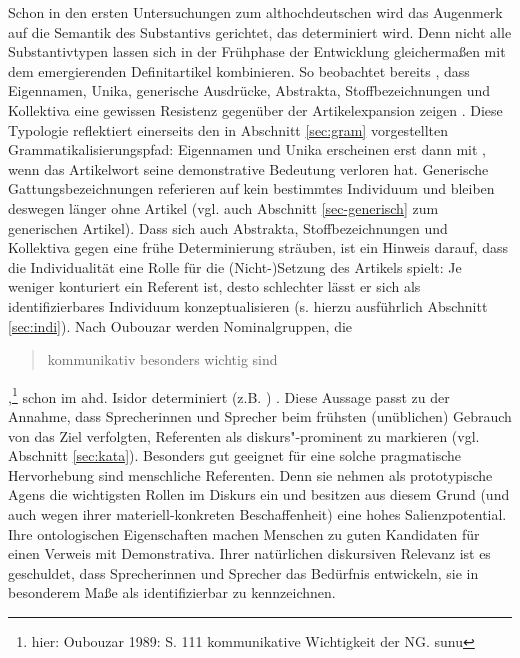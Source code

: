 Schon in den ersten Untersuchungen zum althochdeutschen  wird das Augenmerk auf die Semantik des Substantivs gerichtet, das determiniert wird. Denn nicht alle Substantivtypen lassen sich in der Frühphase der Entwicklung gleichermaßen mit dem emergierenden Definitartikel kombinieren. So beobachtet bereits \textcite{Graf1905}, dass Eigennamen, Unika, generische Ausdrücke, Abstrakta, Stoffbezeichnungen und Kollektiva eine gewissen Resistenz gegenüber der Artikelexpansion zeigen \parencite[ähnlich][]{Bell1907, Hodler1954}. Diese Typologie reflektiert einerseits den in Abschnitt \ref{sec:gram} vorgestellten Grammatikalisierungspfad: Eigennamen und Unika erscheinen erst dann mit , wenn das Artikelwort seine demonstrative Bedeutung verloren hat. Generische Gattungsbezeichnungen referieren auf kein bestimmtes Individuum und bleiben deswegen länger ohne Artikel (vgl. auch Abschnitt \ref{sec-generisch} zum generischen Artikel). Dass sich auch Abstrakta, Stoffbezeichnungen und Kollektiva  gegen eine frühe Determinierung sträuben, ist ein Hinweis darauf, dass die Individualität eine Rolle für die (Nicht-)Setzung des Artikels spielt: Je weniger konturiert ein Referent ist, desto schlechter lässt er sich als identifizierbares Individuum konzeptualisieren (s. hierzu ausführlich Abschnitt \ref{sec:indi}). 
Nach Oubouzar werden Nominalgruppen, die \blockcquote[75]{Oubouzar1992}{kommunikativ besonders wichtig sind},\footnote{hier: Oubouzar 1989: S. 111 kommunikative Wichtigkeit der NG. sunu} schon im ahd. Isidor determiniert (z.B.  ) \parencite[vgl. auch][117f.]{Oubouzar1989}.  
Diese Aussage passt zu der Annahme, dass Sprecherinnen  und Sprecher beim frühsten (unüblichen) Gebrauch von  das Ziel verfolgten, Referenten als diskurs"-prominent zu markieren (vgl. Abschnitt \ref{sec:kata}). 
Besonders gut geeignet für eine solche pragmatische Hervorhebung sind menschliche Referenten. Denn sie nehmen als prototypische Agens die wichtigsten Rollen im Diskurs ein und besitzen aus diesem Grund (und auch wegen ihrer materiell-konkreten Beschaffenheit) eine hohes Salienzpotential. Ihre ontologischen Eigenschaften machen Menschen zu guten Kandidaten für einen Verweis mit  Demonstrativa. Ihrer natürlichen diskursiven Relevanz ist es geschuldet, dass Sprecherinnen und Sprecher das Bedürfnis entwickeln, sie in besonderem Maße als identifizierbar zu kennzeichnen. 
